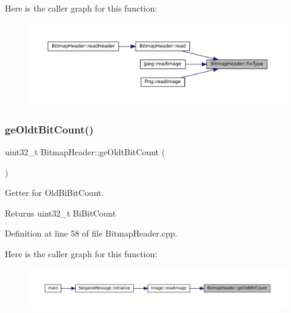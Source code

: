 Here is the caller graph for this function\+:\nopagebreak
\begin{figure}[H]
\begin{center}
\leavevmode
\includegraphics[width=350pt]{classBitmapHeader_aa02e59db95074c6a96a44dac03cee77b_icgraph}
\end{center}
\end{figure}
\mbox{\label{classBitmapHeader_a38ee7e201d7698c591d9ae3335515468}} 
\subsubsection{\texorpdfstring{geOldtBitCount()}{geOldtBitCount()}}
{\footnotesize\ttfamily uint32\+\_\+t Bitmap\+Header\+::ge\+Oldt\+Bit\+Count (\begin{DoxyParamCaption}{ }\end{DoxyParamCaption})}



Getter for Old\+Bi\+Bit\+Count. 

\begin{DoxyReturn}{Returns}
uint32\+\_\+t Bi\+Bit\+Count 
\end{DoxyReturn}


Definition at line 58 of file Bitmap\+Header.\+cpp.

Here is the caller graph for this function\+:\nopagebreak
\begin{figure}[H]
\begin{center}
\leavevmode
\includegraphics[width=350pt]{classBitmapHeader_a38ee7e201d7698c591d9ae3335515468_icgraph}
\end{center}
\end{figure}
\mbox{\label{classBitmapHeader_acce4b6292e2aaf5dbd4bc10687c4fb65}} 
